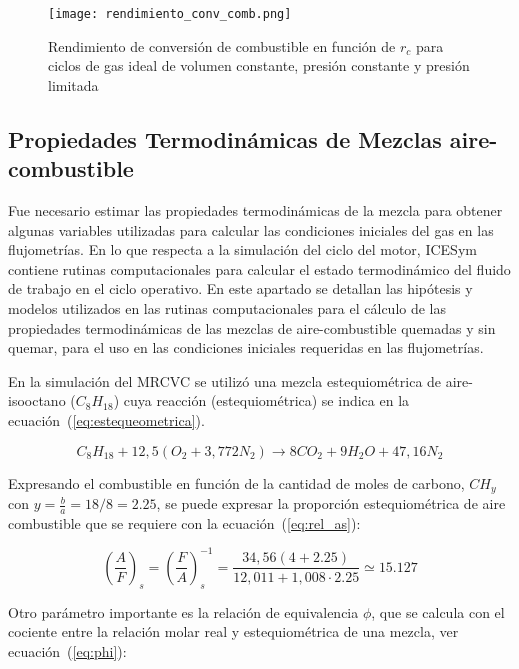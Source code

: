 \begin{figure} \centering
\texttt{[image: rendimiento\_conv\_comb.png]}
    \caption{Rendimiento de conversión de combustible en función de $r_c$ para
ciclos de gas ideal de volumen constante, presión constante y presión
limitada} \label{fig:rendimientos}
\end{figure}


\subsection{Propiedades Termodinámicas de Mezclas aire-combustible}\label{subsec:prop_mezcla}
%
Fue necesario estimar las propiedades termodinámicas de la mezcla para obtener
algunas variables utilizadas para calcular las condiciones iniciales del gas en
las flujometrías.
%
En lo que respecta a la simulación del ciclo del motor, ICESym contiene rutinas
computacionales para calcular el estado termodinámico del fluido de trabajo en
el ciclo operativo.
%
En este apartado se detallan las hipótesis y modelos utilizados en las rutinas
computacionales para el cálculo de las propiedades termodinámicas de las mezclas
de aire-combustible quemadas y sin quemar, para el uso en las condiciones
iniciales requeridas en las flujometrías.

En la simulación del MRCVC se utilizó una mezcla estequiométrica de
aire-isooctano ($C_{8}H_{18}$) cuya reacción (estequiométrica) se indica en la
ecuación~(\ref{eq:estequeometrica}).

\begin{equation} \label{eq:estequeometrica}
  C_{8}H_{18} + 12,5 \left(O_{2}+3,772N_{2}\right) \rightarrow 8 CO_{2} + 9 H_{2}O + 47,16 N_{2}
\end{equation}

Expresando el combustible en función de la cantidad de moles de carbono,
$CH_{y}$ con $y=\frac{b}{a}=18/8=2.25$, se puede expresar la proporción
estequiométrica de aire combustible que se requiere con la
ecuación~(\ref{eq:rel_as}):

\begin{equation} \label{eq:rel_as}
  \left(\frac{A}{F}\right)_{s} = \left(\frac{F}{A}\right)_{s}^{-1} = \frac{34,56(4+2.25)}{12,011 + 1,008\cdot 2.25} \simeq 15.127
\end{equation}

Otro parámetro importante es la relación de equivalencia $\phi$, que se calcula
con el cociente entre la relación molar real y estequiométrica de una mezcla,
ver ecuación~(\ref{eq:phi}):

